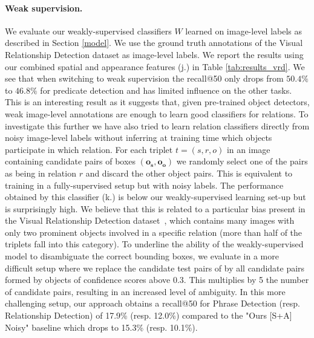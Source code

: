 \documentclass[10pt,twocolumn,letterpaper]{article}
\newcommand{\spaceparagraph}{\vspace{-.35cm}}
\begin{document}
\spaceparagraph
\paragraph{Weak supervision.}
We evaluate our weakly-supervised classifiers $W$ learned on image-level labels as described in Section \ref{model}. We use the ground truth annotations of the Visual Relationship Detection dataset as image-level labels. We report the results using our combined spatial and appearance features (j.) in Table \ref{tab:results_vrd}. We see that when switching to weak supervision the recall@50 only drops from $50.4\%$ to $46.8\%$ for predicate detection and has limited influence on the other tasks. This is an interesting result as it suggests that, given pre-trained object detectors, weak image-level annotations are enough to learn good classifiers for relations. To investigate this further we have also tried to learn relation classifiers directly from noisy image-level labels without inferring at training time which objects participate in which relation.
For each triplet $t=(s,r,o)$ in an image containing candidate pairs of boxes $(\bm{o_s}, \bm{o_o})$ we randomly select one of the pairs as being in relation $r$ and discard the other object pairs. This is equivalent to training in a fully-supervised setup but with noisy labels. 
The performance obtained by this classifier (k.) is  below our weakly-supervised learning set-up but is surprisingly high. We believe that this is related to a particular bias present in the Visual Relationship Detection dataset~\cite{Lu16}, which contains many images with only two prominent objects involved in a specific relation (more than half of the triplets fall into this category). To underline the ability of the weakly-supervised model to disambiguate the correct bounding boxes, we evaluate in a more difficult setup where we replace the candidate test pairs of \cite{Lu16} by all candidate pairs formed by objects of confidence scores above 0.3. This multiplies by 5 the number of candidate pairs, resulting in an increased level of ambiguity. In this more challenging setup, our approach obtains a recall@50 for Phrase Detection (resp. Relationship Detection) of 17.9\% (resp. 12.0\%) compared to the "Ours [S+A] Noisy" baseline which drops to 15.3\% (resp. 10.1\%).
\end{document}

